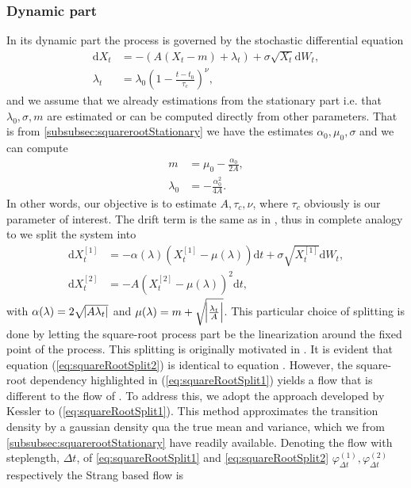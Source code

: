 \subsubsection{Dynamic part}\label{subsubsec:squarerootDynamic}
In its dynamic part the process is governed by the stochastic differential equation
\begin{align}
    \mathrm{d}X_t &= -\left(A\left(X_t - m\right) + \lambda_t\right) + \sigma \sqrt{X_t} \mathrm{d}W_t, \label{eq:dynamicsquarerootSDE}\\
    \lambda_t &= \lambda_0\left(1 - \frac{t - t_0}{\tau_c}\right)^\nu,
\end{align}
and we assume that we already estimations from the stationary part i.e. that $\lambda_0, \sigma, m$ are estimated or can be computed directly from other parameters. That is from \ref{subsubsec:squarerootStationary} we have the estimates $\alpha_0, \mu_0, \sigma$ and we can compute
\begin{align}
    m &= \mu_0 - \frac{\alpha_0}{2A},\\
    \lambda_0 &= - \frac{\alpha_0^2}{4A}.
\end{align}
In other words, our objective is to estimate $A, \tau_c, \nu$, where $\tau_c$ obviously is our parameter of interest. The drift term is the same as in \cite{Ditlevsen2023}, thus in complete analogy to \cite[(S9, S10)]{DitlevsenSupplementary} we split the system into
\begin{align}
    \mathrm{d}X_t^{[1]} &= -\alpha(\lambda)\left(X_t^{[1]} - \mu(\lambda)\right)  \mathrm{d}t + \sigma \sqrt{X_t^{[1]}} \mathrm{d}W_t, \label{eq:squareRootSplit1} \\
    \mathrm{d}X_t^{[2]} &= - A \left(X_t^{[2]} - \mu(\lambda)\right)^2 \mathrm{d}t, \label{eq:squareRootSplit2}
\end{align}
with $\alpha(\lambda) = 2\sqrt{\abs{A\lambda_t}}$ and $\mu(\lambda) = m + \sqrt{\abs{\frac{\lambda_t}{A}}}$.
This particular choice of splitting is done by letting the square-root process part be the linearization around the fixed point of the process. This splitting is originally motivated in \cite[section 2.3 and 2.5]{SplittingSchemes}. It is evident that equation (\ref{eq:squareRootSplit2}) is identical to equation \cite[(S10)]{DitlevsenSupplementary}. However, the square-root dependency highlighted in (\ref{eq:squareRootSplit1}) yields a flow that is different to the flow of \cite[(S9)]{DitlevsenSupplementary}. To address this, we adopt the approach developed by Kessler \cite{Kessler1997} to (\ref{eq:squareRootSplit1}). This method approximates the transition density by a gaussian density qua the true mean and variance, which we from \ref{subsubsec:squarerootStationary} have readily available. Denoting the flow with steplength, $\Delta t$, of \ref{eq:squareRootSplit1} and \ref{eq:squareRootSplit2} $\varphi_{\Delta t}^{(1)}, \varphi_{\Delta t}^{(2)}$ respectively the Strang based flow is 
